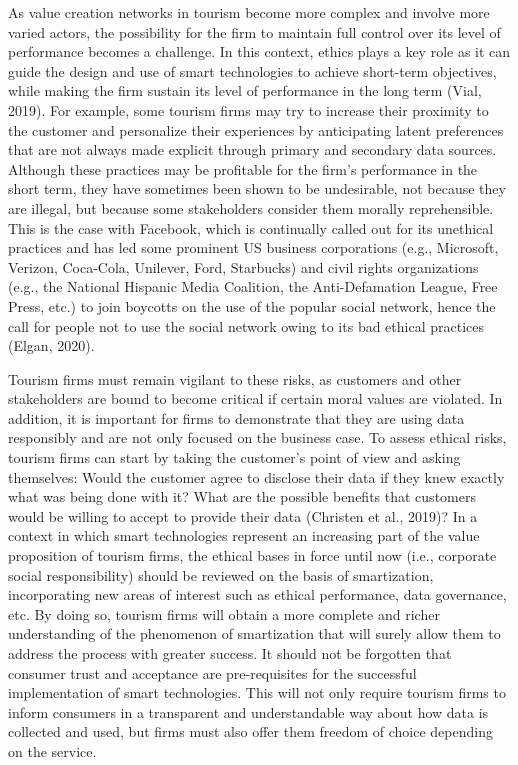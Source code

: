 \documentclass[
  letterpaper,
  DIV=11,
  numbers=noendperiod]{scrreprt}
\begin{document}
As value creation networks in tourism become more complex and involve
more varied actors, the possibility for the firm to maintain full
control over its level of performance becomes a challenge. In this
context, ethics plays a key role as it can guide the design and use of
smart technologies to achieve short-term objectives, while making the
firm sustain its level of performance in the long term (Vial, 2019). For
example, some tourism firms may try to increase their proximity to the
customer and personalize their experiences by anticipating latent
preferences that are not always made explicit through primary and
secondary data sources. Although these practices may be profitable for
the firm's performance in the short term, they have sometimes been shown
to be undesirable, not because they are illegal, but because some
stakeholders consider them morally reprehensible. This is the case with
Facebook, which is continually called out for its unethical practices
and has led some prominent US business corporations (e.g., Microsoft,
Verizon, Coca-Cola, Unilever, Ford, Starbucks) and civil rights
organizations (e.g., the National Hispanic Media Coalition, the
Anti-Defamation League, Free Press, etc.) to join boycotts on the use of
the popular social network, hence the call for people not to use the
social network owing to its bad ethical practices (Elgan, 2020).

Tourism firms must remain vigilant to these risks, as customers and
other stakeholders are bound to become critical if certain moral values
are violated. In addition, it is important for firms to demonstrate that
they are using data responsibly and are not only focused on the business
case. To assess ethical risks, tourism firms can start by taking the
customer's point of view and asking themselves: Would the customer agree
to disclose their data if they knew exactly what was being done with it?
What are the possible benefits that customers would be willing to accept
to provide their data (Christen et al., 2019)? In a context in which
smart technologies represent an increasing part of the value proposition
of tourism firms, the ethical bases in force until now (i.e., corporate
social responsibility) should be reviewed on the basis of smartization,
incorporating new areas of interest such as ethical performance, data
governance, etc. By doing so, tourism firms will obtain a more complete
and richer understanding of the phenomenon of smartization that will
surely allow them to address the process with greater success. It should
not be forgotten that consumer trust and acceptance are pre-requisites
for the successful implementation of smart technologies. This will not
only require tourism firms to inform consumers in a transparent and
understandable way about how data is collected and used, but firms must
also offer them freedom of choice depending on the service.
\end{document}
